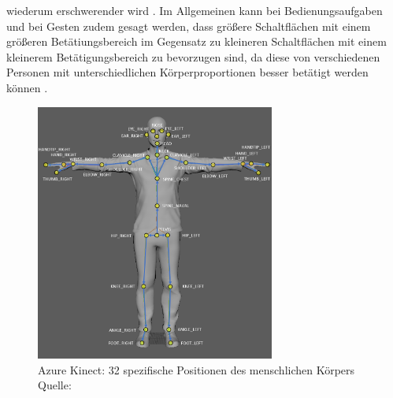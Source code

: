 wiederum erschwerender wird \cite{erickjpaul_komfort_nodate}. Im Allgemeinen kann bei Bedienungsaufgaben und bei Gesten zudem gesagt werden, dass größere Schaltflächen mit einem größeren Betätiungsbereich im Gegensatz zu kleineren Schaltflächen mit einem kleinerem Betätigungsbereich zu bevorzugen sind, da diese von verschiedenen Personen mit unterschiedlichen Körperproportionen besser betätigt werden können \cite{boll_mensch_2013}.



\begin{figure}[htb]
	\centering
	\includegraphics[width=0.70\textwidth]{images/loesungsweg/joint_hierarchy}
	\caption[Azure Kinect: 32 spezifische Positionen des menschlichen Körpers]{Azure Kinect: 32 spezifische Positionen des menschlichen Körpers \\Quelle: \cite{qm13_azure_joints_nodate}}
	\label{fig:joint_hierarchy}
\end{figure}
\FloatBarrier

